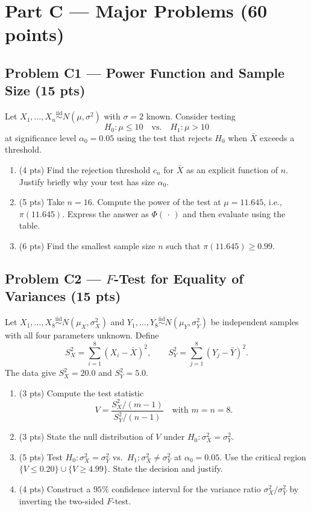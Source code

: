 \documentclass[11pt]{article}
\newcommand{\iid}{\stackrel{\text{iid}}{\sim}}
\begin{document}
\section*{Part C --- Major Problems (60 points)}

\subsection*{Problem C1 --- Power Function and Sample Size (15 pts)}

Let $X_1, \dots, X_n \iid N(\mu, \sigma^2)$ with $\sigma = 2$ known. Consider testing
\[
H_0: \mu \le 10 \quad \text{vs.} \quad H_1: \mu > 10
\]
at significance level $\alpha_0 = 0.05$ using the test that rejects $H_0$ when $\bar{X}$ exceeds a threshold.

\begin{enumerate}[label=(\alph*),leftmargin=2em]
    \item (4 pts) Find the rejection threshold $c_n$ for $\bar{X}$ as an explicit function of $n$. Justify briefly why your test has size $\alpha_0$.
    \item (5 pts) Take $n = 16$. Compute the power of the test at $\mu = 11.645$, i.e., $\pi(11.645)$. Express the answer as $\Phi(\,\cdot\,)$ and then evaluate using the table.
    \item (6 pts) Find the smallest sample size $n$ such that $\pi(11.645) \ge 0.99$.
\end{enumerate}

\subsection*{Problem C2 --- $F$-Test for Equality of Variances (15 pts)}

Let $X_1, \dots, X_8 \iid N(\mu_X, \sigma_X^2)$ and $Y_1, \dots, Y_8 \iid N(\mu_Y, \sigma_Y^2)$ be independent samples with all four parameters unknown. Define
\[
S_X^2 = \sum_{i=1}^8 (X_i - \bar{X})^2, \qquad S_Y^2 = \sum_{j=1}^8 (Y_j - \bar{Y})^2.
\]
The data give $S_X^2 = 20.0$ and $S_Y^2 = 5.0$.

\begin{enumerate}[label=(\alph*),leftmargin=2em]
    \item (3 pts) Compute the test statistic
    \[
    V = \frac{S_X^2/(m-1)}{S_Y^2/(n-1)} \quad\text{with } m = n = 8.
    \]
    \item (3 pts) State the null distribution of $V$ under $H_0: \sigma_X^2 = \sigma_Y^2$.
    \item (5 pts) Test $H_0: \sigma_X^2 = \sigma_Y^2$ vs.\ $H_1: \sigma_X^2 \ne \sigma_Y^2$ at $\alpha_0 = 0.05$. Use the critical region $\{V \le 0.20\} \cup \{V \ge 4.99\}$. State the decision and justify.
    \item (4 pts) Construct a $95\%$ confidence interval for the variance ratio $\sigma_X^2/\sigma_Y^2$ by inverting the two-sided $F$-test.
\end{enumerate}
\end{document}
